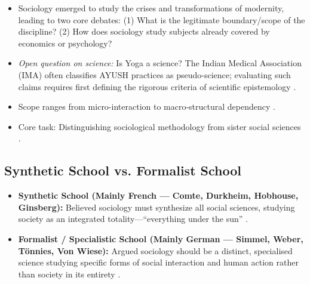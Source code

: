 \begin{CriticalPoint}
\begin{itemize}
    \item Sociology emerged to study the crises and transformations of modernity, leading to two core debates: (1) What is the legitimate boundary/scope of the discipline? (2) How does sociology study subjects already covered by economics or psychology? 
    \item \textit{Open question on science:} Is Yoga a science? The Indian Medical Association (IMA) often classifies AYUSH practices as pseudo-science; evaluating such claims requires first defining the rigorous criteria of scientific epistemology .
\end{itemize}
\end{CriticalPoint}

\begin{QuickRevision}
\begin{itemize}
    \item Scope ranges from micro-interaction to macro-structural dependency .
    \item Core task: Distinguishing sociological methodology from sister social sciences .
\end{itemize}
\end{QuickRevision}

\subsection{Synthetic School vs. Formalist School}

\begin{ComparisonBox}
\begin{itemize}
    \item \textbf{Synthetic School (Mainly French --- Comte, Durkheim, Hobhouse, Ginsberg):} Believed sociology must synthesize all social sciences, studying society as an integrated totality---``everything under the sun'' .
    \item \textbf{Formalist / Specialistic School (Mainly German --- Simmel, Weber, Tönnies, Von Wiese):} Argued sociology should be a distinct, specialised science studying specific forms of social interaction and human action rather than society in its entirety .
\end{itemize}
\end{ComparisonBox}

